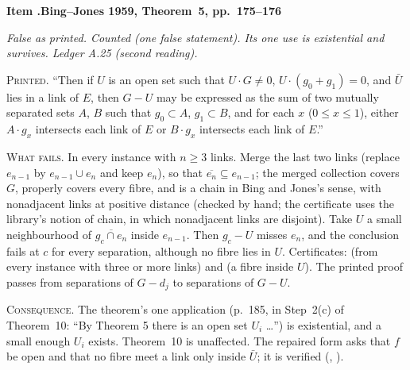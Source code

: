 \documentclass[11pt]{article}
\newcounter{defect}
\newenvironment{defect}[4]{%
  \par\addvspace{10pt}\refstepcounter{defect}%
  \noindent\textbf{Item \thedefect.\enspace #1}\par\nopagebreak
  \noindent\textit{#2}\par\nopagebreak\smallskip}{\par\addvspace{6pt}}
\newcommand{\fld}[1]{\par\noindent\textsc{#1.}\enspace}
\begin{document}
\begin{defect}{Bing--Jones 1959, Theorem~5, pp.~175--176}{False as printed. Counted (one false
statement). Its one use is existential and survives. Ledger A.25 (second reading).}{1}{0}\label{it:bj5}

\fld{Printed} ``Then if $U$ is an open set such that $U\cdot G\neq0$, $U\cdot(g_0+g_1)=0$, and
$\bar U$ lies in a link of $E$, then $G-U$ may be expressed as the sum of two mutually separated
sets $A$, $B$ such that $g_0\subset A$, $g_1\subset B$, and for each $x$ ($0\le x\le1$), either
$A\cdot g_x$ intersects each link of $E$ or $B\cdot g_x$ intersects each link of $E$.''

\fld{What fails} In every instance with $n\ge3$ links. Merge the last two links (replace
$e_{n-1}$ by $e_{n-1}\cup e_n$ and keep $e_n$), so that $\overline{e_n}\subseteq e_{n-1}$; the
merged collection covers $G$, properly covers every fibre, and is a chain in Bing and Jones's sense,
with nonadjacent links at positive distance (checked by hand; the certificate uses the library's
notion of chain, in which nonadjacent links are disjoint).
Take $U$ a small neighbourhood of $\overline{g_c\cap e_n}$ inside $e_{n-1}$. Then $g_c-U$ misses
$e_n$, and the conclusion fails at $c$ for every separation, although no fibre lies in $U$.
Certificates:  (from every instance with three or more
links) and  (a fibre inside $U$). The printed proof passes from
separations of $G-d_j$ to separations of $G-U$.

\fld{Consequence} The theorem's one application (p.~185, in Step~2(c) of Theorem~10: ``By Theorem 5
there is an open set $U_i$ \ldots'') is existential, and a small enough $U_i$ exists. Theorem~10 is
unaffected. The repaired form asks that $f$ be open and that no fibre meet a link only inside
$\bar U$; it is verified (, ).
\end{defect}
\end{document}
